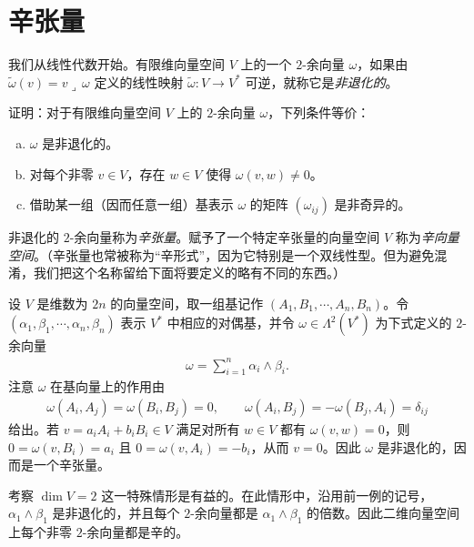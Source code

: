 \documentclass[../../main.tex]{subfiles}
\begin{document}
\section{辛张量}\label{section:ch22-symplectic-tensors}

我们从线性代数开始。有限维向量空间 $V$ 上的一个 $2$-余向量 $\omega$，如果由 $\widetilde\omega(v)=v\lrcorner\,\omega$ 定义的线性映射 $\widetilde\omega:V\to V^*$ 可逆，就称它是\emph{非退化的}。

\begin{exercise}\label{exercise:ch22-01}
证明：对于有限维向量空间 $V$ 上的 $2$-余向量 $\omega$，下列条件等价：
\begin{enumerate}[(a)]
\item $\omega$ 是非退化的。
\item 对每个非零 $v\in V$，存在 $w\in V$ 使得 $\omega(v,w)\neq0$。
\item 借助某一组（因而任意一组）基表示 $\omega$ 的矩阵 $(\omega_{ij})$ 是非奇异的。
\end{enumerate}
\end{exercise}

非退化的 $2$-余向量称为\emph{辛张量}。赋予了一个特定辛张量的向量空间 $V$ 称为\emph{辛向量空间}。（辛张量也常被称为“辛形式”，因为它特别是一个双线性型。但为避免混淆，我们把这个名称留给下面将要定义的略有不同的东西。）

\begin{example}\label{example:ch22-standard-symplectic-tensor}
设 $V$ 是维数为 $2n$ 的向量空间，取一组基记作 $(A_1,B_1,\cdots ,A_n,B_n)$。令 $(\alpha_1,\beta_1,\cdots ,\alpha_n,\beta_n)$ 表示 $V^*$ 中相应的对偶基，并令 $\omega\in\Lambda^2(V^*)$ 为下式定义的 $2$-余向量
\begin{align}\label{align:ch22-standard-symplectic-tensor}
\omega=\sum_{i=1}^n \alpha_i\wedge\beta_i.
\end{align}
注意 $\omega$ 在基向量上的作用由
\begin{align}
\omega(A_i,A_j)=\omega(B_i,B_j)=0,\qquad
\omega(A_i,B_j)=-\omega(B_j,A_i)=\delta_{ij}
\label{align:ch22-standard-symplectic-tensor-2}
\end{align}
给出。若 $v=a_iA_i+b_iB_i\in V$ 满足对所有 $w\in V$ 都有 $\omega(v,w)=0$，则 $0=\omega(v,B_i)=a_i$ 且 $0=\omega(v,A_i)=-b_i$，从而 $v=0$。因此 $\omega$ 是非退化的，因而是一个辛张量。
\end{example}

考察 $\dim V=2$ 这一特殊情形是有益的。在此情形中，沿用前一例的记号，$\alpha_1\wedge\beta_1$ 是非退化的，并且每个 $2$-余向量都是 $\alpha_1\wedge\beta_1$ 的倍数。因此二维向量空间上每个非零 $2$-余向量都是辛的。
\end{document}
